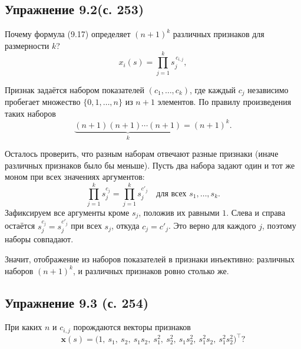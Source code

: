 \subsection{Упражнение 9.2(с. 253)}
Почему формула (9.17) определяет $(n+1)^k$ различных признаков для размерности
$k$?
\begin{equation}
    x_i(s) = \prod_{j=1}^{k} s_j^{\,c_{i,j}},
    \tag{9.17}
\end{equation}
\begin{solution}
    Признак задаётся набором показателей $(c_1, \dots, c_k)$, где каждый
    $c_j$ независимо пробегает множество $\{0, 1, \dots, n\}$ из $n+1$ элементов.
    По правилу произведения таких наборов
    \begin{equation*}
        \underbrace{(n+1)(n+1)\cdots(n+1)}_{k} = (n+1)^k.
    \end{equation*}

    Осталось проверить, что разным наборам отвечают разные признаки (иначе
    различных признаков было бы меньше). Пусть два набора задают один и тот же
    моном при всех значениях аргументов:
    \begin{equation*}
        \prod_{j=1}^{k} s_j^{c_j} = \prod_{j=1}^{k} s_j^{c'_j}
        \quad \text{для всех } s_1, \dots, s_k.
    \end{equation*}
    Зафиксируем все аргументы кроме $s_j$, положив их равными $1$. Слева и справа
    остаётся $s_j^{c_j} = s_j^{c'_j}$ при всех $s_j$, откуда $c_j = c'_j$. Это
    верно для каждого $j$, поэтому наборы совпадают.

    Значит, отображение из наборов показателей в признаки инъективно: различных
    наборов $(n+1)^k$, и различных признаков ровно столько же.
\end{solution}

\subsection{Упражнение 9.3 (с. 254)}
При каких $n$ и $c_{i,j}$ порождаются векторы признаков
\begin{equation*}
    \mathbf x(s) = \big(1,\ s_1,\ s_2,\ s_1 s_2,\ s_1^2,\ s_2^2,\ s_1 s_2^2,\ s_1^2 s_2,\ s_1^2 s_2^2\big)^\top ?
\end{equation*}

